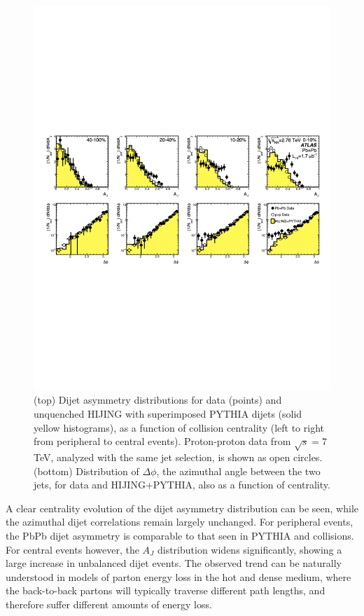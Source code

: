 \begin{figure}[thb]
\begin{center}
\vspace{-9cm}
\includegraphics[width=0.9\mboxwidth]{jetfigures/ATLAS_dijet_crop.pdf}
\vspace{-7.5cm}
\caption{
(top) Dijet asymmetry distributions for data (points) and unquenched HIJING with superimposed PYTHIA dijets (solid yellow histograms),
as a function of collision centrality (left to right from peripheral
to central events).  Proton-proton data from $\sqrt{s}=7$ TeV, analyzed with the same jet selection, is shown as open circles.
(bottom) Distribution of $\Delta\phi$, the azimuthal angle between the two jets, for data and HIJING+PYTHIA, also as a function of centrality.
\label{fig:GR:ATLAS_dijet}
}
\end{center}
\end{figure}

A clear centrality evolution of the dijet asymmetry distribution can be seen, while the azimuthal
dijet correlations remain largely unchanged. For peripheral events, the PbPb dijet asymmetry
is comparable to that seen in PYTHIA and \pp collisions. For central events however, 
the $A_J$ distribution widens significantly, showing a large increase in unbalanced
dijet events. The observed trend can be naturally understood in models of parton energy
loss in the hot and dense medium, where the back-to-back partons will typically traverse
different path lengths, and therefore suffer different amounts of energy loss.

